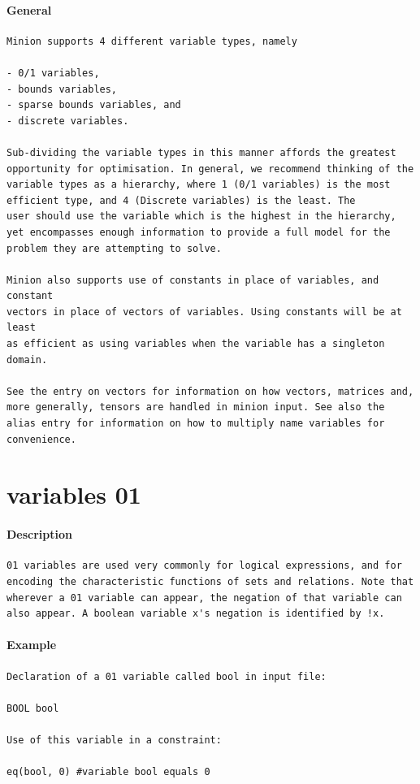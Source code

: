 \documentclass[oneside]{book}
\begin{document}
\paragraph{General}
{\footnotesize
\begin{verbatim}
Minion supports 4 different variable types, namely

- 0/1 variables,
- bounds variables,
- sparse bounds variables, and
- discrete variables.

Sub-dividing the variable types in this manner affords the greatest
opportunity for optimisation. In general, we recommend thinking of the
variable types as a hierarchy, where 1 (0/1 variables) is the most
efficient type, and 4 (Discrete variables) is the least. The
user should use the variable which is the highest in the hierarchy,
yet encompasses enough information to provide a full model for the
problem they are attempting to solve.

Minion also supports use of constants in place of variables, and constant
vectors in place of vectors of variables. Using constants will be at least
as efficient as using variables when the variable has a singleton domain.

See the entry on vectors for information on how vectors, matrices and,
more generally, tensors are handled in minion input. See also the
alias entry for information on how to multiply name variables for
convenience.
\end{verbatim}
}
\section{variables 01}
\paragraph{Description}
{\footnotesize
\begin{verbatim}
01 variables are used very commonly for logical expressions, and for
encoding the characteristic functions of sets and relations. Note that
wherever a 01 variable can appear, the negation of that variable can
also appear. A boolean variable x's negation is identified by !x.
\end{verbatim}
}
\paragraph{Example}
{\footnotesize
\begin{verbatim}
Declaration of a 01 variable called bool in input file:

BOOL bool

Use of this variable in a constraint:

eq(bool, 0) #variable bool equals 0
\end{verbatim}
}
\end{document}
